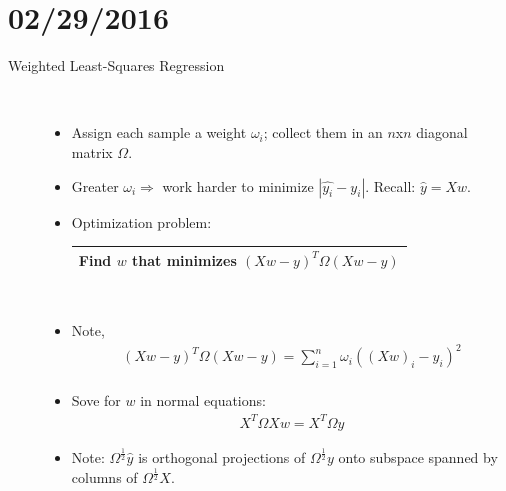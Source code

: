\documentclass[10pt]{article}
\begin{document}
\section*{02/29/2016}
\begin{description}
	\item[Weighted Least-Squares Regression]
	\
	\begin{itemize}
		\item Assign each sample a weight $\omega_{i}$; collect them in an $n$x$n$ diagonal matrix $\Omega$.
		\item Greater $\omega_{i} \Rightarrow$ work harder to minimize $|\hat{y_{i}} - y_{i}|$. Recall: $\hat{y} = Xw$.
		\item Optimization problem:
			\begin{center}
				\begin{tabular}{|c|}
					\hline
					Find $w$ that minimizes $(Xw - y)^{T} \Omega (Xw-y)$\\
					\hline
				\end{tabular}\\
			\end{center}
		\item Note,
			\begin{align*}
				(Xw - y)^{T}\Omega (Xw-y) = \sum_{i=1}^{n} \omega_{i}((Xw)_{i} - y_{i})^{2}\\
			\end{align*}
		\item Sove for $w$ in normal equations:	
			\begin{align*}
				X^{T}\Omega Xw = X^{T}\Omega y
			\end{align*}
		\item Note: $\Omega^{\frac{1}{2}}\hat{y}$ is orthogonal projections of $\Omega^{\frac{1}{2}}y$ onto subspace spanned by columns of $\Omega^{\frac{1}{2}}X$.
	\end{itemize}
	

\end{description}
\end{document}
